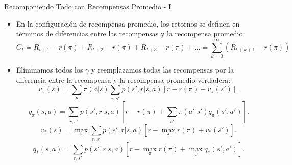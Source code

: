 \documentclass[10pt, envcountsect, handout, aspectratio=1610, hyperref={hypertexnames=true}]{beamer}
\begin{document}
\begin{frame}{Recomponiendo Todo con Recompensas Promedio - I}
	
	\begin{itemize}
		\item {} En la configuración de recompensa promedio, los retornos se definen en términos de diferencias entre las recompensas y la recompensa promedio:
		\[
		G_t \doteq R_{t+1} - r(\pi) + R_{t+2} - r(\pi) + R_{t+3} - r(\pi) + \dots =
		\sum_{k=0}^\infty (R_{t+k+1} - r(\pi))
		\]

%		
		\item {} Eliminamos todos los $\gamma$ y reemplazamos todas las recompensas por la diferencia entre la recompensa y la recompensa promedio verdadera:
		\[
		v_\pi(s) = \sum_a \pi(a|s) \sum_{r, s'} p(s', r | s, a) \left[ r - r(\pi) + v_\pi(s') \right].
		\]
		\[
		q_\pi(s, a) = \sum_{r, s'} p(s', r | s, a) \left[ r - r(\pi) + \sum_{a'} \pi(a'|s') q_\pi(s', a') \right].
		\]
		\[
		v_* (s) = \max_\pi \sum_{r, s'} p(s', r | s, a) \left[ r - \max_\pi r(\pi) + v_*(s') \right].
		\]
		\[
		q_* (s, a) = \sum_{r, s'} p(s', r | s, a) \left[ r - \max_\pi r(\pi) + \max_{a'} q_*(s', a') \right].
		\]
		
	\end{itemize}
	
\end{frame}
\end{document}
